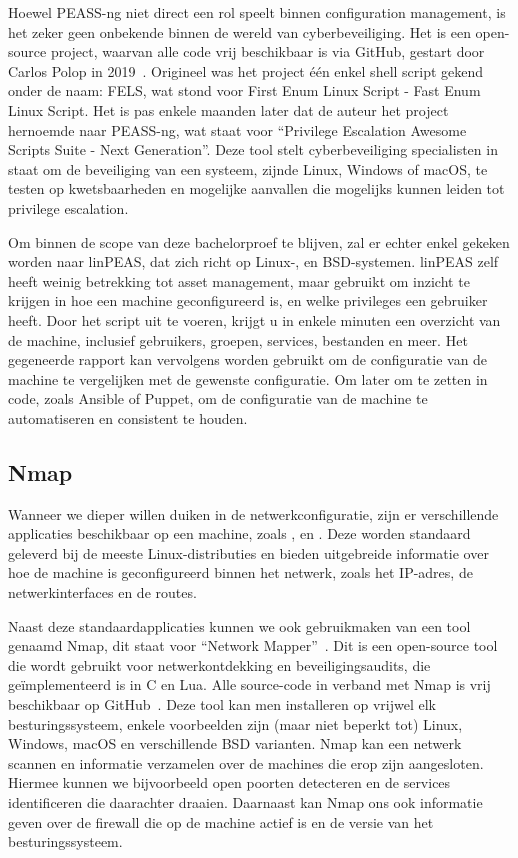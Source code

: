 Hoewel PEASS-ng niet direct een rol speelt binnen configuration management, is het zeker geen onbekende binnen de wereld van cyberbeveiliging.
Het is een open-source project, waarvan alle code vrij beschikbaar is via GitHub, gestart door Carlos Polop in 2019~\autocite{peass-ng-github}.
Origineel was het project \'e\'en enkel shell script gekend onder de naam: FELS, wat stond voor First Enum Linux Script - Fast Enum Linux Script.
Het is pas enkele maanden later dat de auteur het project hernoemde naar PEASS-ng, wat staat voor ``Privilege Escalation Awesome Scripts Suite - Next Generation''.
Deze tool stelt cyberbeveiliging specialisten in staat om de beveiliging van een systeem, zijnde Linux, Windows of macOS, te testen op kwetsbaarheden en mogelijke aanvallen die mogelijks kunnen leiden tot privilege escalation.

Om binnen de scope van deze bachelorproef te blijven, zal er echter enkel gekeken worden naar linPEAS, dat zich richt op Linux-, en BSD-systemen.
linPEAS zelf heeft weinig betrekking tot asset management, maar gebruikt om inzicht te krijgen in hoe een machine geconfigureerd is, en welke privileges een gebruiker heeft.
Door het script uit te voeren, krijgt u in enkele minuten een overzicht van de machine, inclusief gebruikers, groepen, services, bestanden en meer.
Het gegeneerde rapport kan vervolgens worden gebruikt om de configuratie van de machine te vergelijken met de gewenste configuratie.
Om later om te zetten in code, zoals Ansible of Puppet, om de configuratie van de machine te automatiseren en consistent te houden.

\subsection{Nmap}
\label{sub:nmap}

Wanneer we dieper willen duiken in de netwerkconfiguratie, zijn er verschillende applicaties beschikbaar op een machine, zoals ,  en .
Deze worden standaard geleverd bij de meeste Linux-distributies en bieden uitgebreide informatie over hoe de machine is geconfigureerd binnen het netwerk, zoals het IP-adres, de netwerkinterfaces en de routes.

Naast deze standaardapplicaties kunnen we ook gebruikmaken van een tool genaamd Nmap, dit staat voor ``Network Mapper''~\autocite{nmap-website}.
Dit is een open-source tool die wordt gebruikt voor netwerkontdekking en beveiligingsaudits, die ge\"implementeerd is in C en Lua.
Alle source-code in verband met Nmap is vrij beschikbaar op GitHub~\autocite{nmap-github}.
Deze tool kan men installeren op vrijwel elk besturingssysteem, enkele voorbeelden zijn (maar niet beperkt tot) Linux, Windows, macOS en verschillende BSD varianten.
Nmap kan een netwerk scannen en informatie verzamelen over de machines die erop zijn aangesloten.
Hiermee kunnen we bijvoorbeeld open poorten detecteren en de services identificeren die daarachter draaien.
Daarnaast kan Nmap ons ook informatie geven over de firewall die op de machine actief is en de versie van het besturingssysteem.

